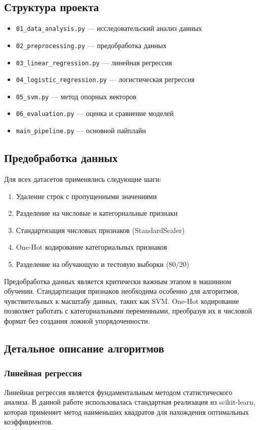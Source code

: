 \documentclass[a4paper]{article}
\begin{document}
\subsection{Структура проекта}
\begin{itemize}
    \item \texttt{01\_data\_analysis.py} — исследовательский анализ данных
    \item \texttt{02\_preprocessing.py} — предобработка данных
    \item \texttt{03\_linear\_regression.py} — линейная регрессия
    \item \texttt{04\_logistic\_regression.py} — логистическая регрессия
    \item \texttt{05\_svm.py} — метод опорных векторов
    \item \texttt{06\_evaluation.py} — оценка и сравнение моделей
    \item \texttt{main\_pipeline.py} — основной пайплайн
\end{itemize}

\subsection{Предобработка данных}
Для всех датасетов применялись следующие шаги:
\begin{enumerate}
    \item Удаление строк с пропущенными значениями
    \item Разделение на числовые и категориальные признаки
    \item Стандартизация числовых признаков (StandardScaler)
    \item One-Hot кодирование категориальных признаков
    \item Разделение на обучающую и тестовую выборки (80/20)
\end{enumerate}

Предобработка данных является критически важным этапом в машинном обучении. Стандартизация признаков необходима особенно для алгоритмов, чувствительных к масштабу данных, таких как SVM. One-Hot кодирование позволяет работать с категориальными переменными, преобразуя их в числовой формат без создания ложной упорядоченности.

\subsection{Детальное описание алгоритмов}

\subsubsection{Линейная регрессия}
Линейная регрессия является фундаментальным методом статистического анализа. В данной работе использовалась стандартная реализация из scikit-learn, которая применяет метод наименьших квадратов для нахождения оптимальных коэффициентов. 
\end{document}
